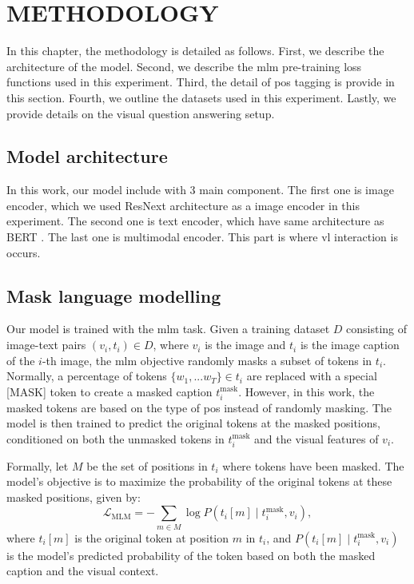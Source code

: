 \chapter{METHODOLOGY}
In this chapter, the methodology is detailed as follows. 
First, we describe the architecture of the model. 
Second, we describe the \acrshort{mlm} pre-training loss functions used in this experiment.
Third, the detail of \acrshort{pos} tagging is provide in this section.
Fourth, we outline the datasets used in this experiment. 
Lastly, we provide details on the visual question answering setup.

\section{Model architecture}
In this work, our model include with 3 main component. The first one is image encoder, which we used ResNext \cite{resnext} architecture as a image encoder in this experiment.
The second one is text encoder, which have same architecture as BERT \cite{bert}.
The last one is multimodal encoder.
This part is where \acrshort{vl} interaction is occurs.

\section{Mask language modelling}
Our model is trained with the \acrshort{mlm} task. 
Given a training dataset \(D\) consisting of image-text pairs \((v_i, t_i) \in D\), where \(v_i\) is the image and \(t_i\) is the image caption of the \(i\)-th image, the \acrshort{mlm} objective randomly masks a subset of tokens in \(t_i\). 
Normally, a percentage of tokens \(\{w_1,...w_T\} \in t_i\) are replaced with a special [MASK] token to create a masked caption \(t_i^{\text{mask}}\).
However, in this work, the masked tokens are based on the type of \acrshort{pos} instead of randomly masking.
The model is then trained to predict the original tokens at the masked positions, conditioned on both the unmasked tokens in \(t_i^{\text{mask}}\) and the visual features of \(v_i\). 

Formally, let \(M\) be the set of positions in \(t_i\) where tokens have been masked. 
The model’s objective is to maximize the probability of the original tokens at these masked positions, given by:
\[
\mathcal{L}_{\text{MLM}} = - \sum_{m \in M} \log P\left(t_i[m] \mid t_i^{\text{mask}}, v_i\right),
\]
where \(t_i[m]\) is the original token at position \(m\) in \(t_i\), and \(P(t_i[m] \mid t_i^{\text{mask}}, v_i)\) is the model's predicted probability of the token based on both the masked caption and the visual context. 

